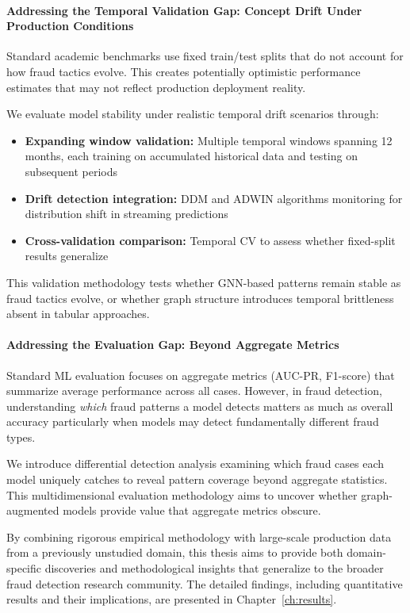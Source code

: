 \paragraph{Addressing the Temporal Validation Gap: Concept Drift Under Production Conditions}

Standard academic benchmarks use fixed train/test splits that do not account for how fraud tactics evolve. This creates potentially optimistic performance estimates that may not reflect production deployment reality.

We evaluate model stability under realistic temporal drift scenarios through:

\begin{itemize}
    \item \textbf{Expanding window validation:} Multiple temporal windows spanning 12 months, each training on accumulated historical data and testing on subsequent periods
    \item \textbf{Drift detection integration:} DDM and ADWIN algorithms monitoring for distribution shift in streaming predictions
    \item \textbf{Cross-validation comparison:} Temporal CV to assess whether fixed-split results generalize
\end{itemize}

This validation methodology tests whether GNN-based patterns remain stable as fraud tactics evolve, or whether graph structure introduces temporal brittleness absent in tabular approaches.

\paragraph{Addressing the Evaluation Gap: Beyond Aggregate Metrics}

Standard ML evaluation focuses on aggregate metrics (AUC-PR, F1-score) that summarize average performance across all cases. However, in fraud detection, understanding \emph{which} fraud patterns a model detects matters as much as overall accuracy particularly when models may detect fundamentally different fraud types.

We introduce differential detection analysis examining which fraud cases each model uniquely catches to reveal pattern coverage beyond aggregate statistics. This multidimensional evaluation methodology aims to uncover whether graph-augmented models provide value that aggregate metrics obscure.

By combining rigorous empirical methodology with large-scale production data from a previously unstudied domain, this thesis aims to provide both domain-specific discoveries and methodological insights that generalize to the broader fraud detection research community. The detailed findings, including quantitative results and their implications, are presented in Chapter~\ref{ch:results}.
